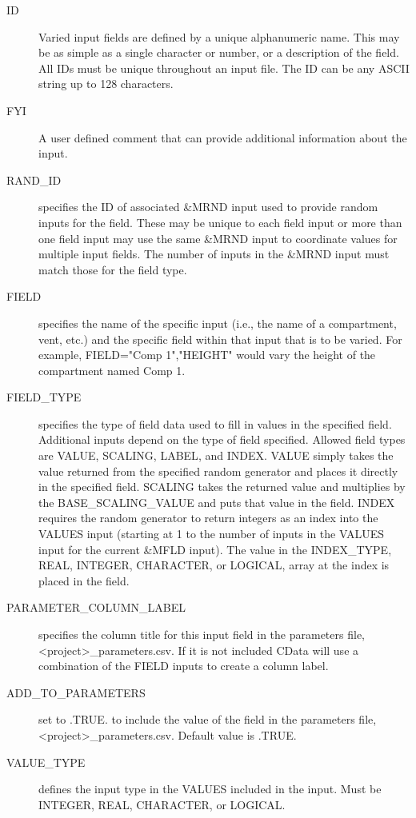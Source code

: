 \documentclass[12pt,twoside]{book}
\begin{document}
\begin{description}
  \item[ID] Varied input fields are defined by a unique alphanumeric name. This may be as simple as a single character or number, or a description of the field. All IDs must be unique throughout an input file.  The { \ct ID} can be any ASCII string up to 128 characters.
  \item[FYI] A user defined comment that can provide additional information about the input.
  \item[RAND\_ID] specifies the ID of associated {\ct \&MRND} input used to provide random inputs for the field. These may be unique to each field input or more than one field input may use the same {\ct \&MRND} input to coordinate values for multiple input fields. The number of inputs in the {\ct \&MRND} input must match those for the field type.
  \item[FIELD] specifies the name of the specific input (i.e., the name of a compartment, vent, etc.) and the specific field within that input that is to be varied. For example, {\ct FIELD="Comp 1","HEIGHT"} would vary the height of the compartment named {\ct Comp 1}.
  \item[FIELD\_TYPE] specifies the type of field data used to fill in values in the specified field. Additional inputs depend on the type of field specified. Allowed field types are {\ct VALUE}, {\ct SCALING}, {\ct LABEL}, and {\ct INDEX}. {\ct VALUE} simply takes the value returned from the specified random generator and places it directly in the specified field. {\ct SCALING} takes the returned value and multiplies by the {\ct BASE\_SCALING\_VALUE} and puts that value in the field. {\ct INDEX} requires the random generator to return integers as an index into the {\ct VALUES} input (starting at 1 to the number of inputs in the {\ct VALUES} input for the current {\ct \&MFLD} input). The value in the {\ct INDEX\_TYPE}, {\ct REAL}, {\ct INTEGER}, {\ct CHARACTER}, or {\ct LOGICAL}, array at the index is placed in the field.
  \item[PARAMETER\_COLUMN\_LABEL] specifies the column title for this input field in the parameters file, {\ct <project>\_parameters.csv}. If it is not included CData will use a combination of the {\ct FIELD} inputs to create a column label.
  \item[ADD\_TO\_PARAMETERS] set to .TRUE. to include the value of the field in the parameters file, {\ct <project>\_parameters.csv}. Default value is .TRUE.
  \item[VALUE\_TYPE] defines the input type in the {\ct VALUES} included in the input. Must be {\ct INTEGER}, {\ct REAL}, {\ct CHARACTER}, or {\ct LOGICAL}.

\end{description}
\end{document}

